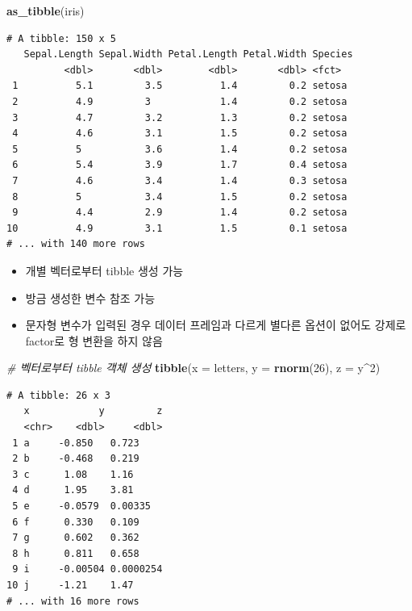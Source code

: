 \documentclass[
  11pt,
]{krantz}
\newenvironment{Shaded}{\begin{snugshade}}{\end{snugshade}}
\newcommand{\CommentTok}[1]{\textcolor[rgb]{0.37,0.37,0.37}{\textit{#1}}}
\newcommand{\DataTypeTok}[1]{\textcolor[rgb]{0.27,0.27,0.27}{#1}}
\newcommand{\DecValTok}[1]{\textcolor[rgb]{0.06,0.06,0.06}{#1}}
\newcommand{\KeywordTok}[1]{\textcolor[rgb]{0.27,0.27,0.27}{\textbf{#1}}}
\newcommand{\NormalTok}[1]{#1}
\newcommand{\OperatorTok}[1]{\textcolor[rgb]{0.43,0.43,0.43}{\textbf{#1}}}
\providecommand{\tightlist}{%
  \setlength{\itemsep}{0pt}\setlength{\parskip}{0pt}}
\begin{document}
\begin{Shaded}
\begin{Highlighting}[]
\KeywordTok{as_tibble}\NormalTok{(iris)}
\end{Highlighting}
\end{Shaded}

\begin{verbatim}
# A tibble: 150 x 5
   Sepal.Length Sepal.Width Petal.Length Petal.Width Species
          <dbl>       <dbl>        <dbl>       <dbl> <fct>  
 1          5.1         3.5          1.4         0.2 setosa 
 2          4.9         3            1.4         0.2 setosa 
 3          4.7         3.2          1.3         0.2 setosa 
 4          4.6         3.1          1.5         0.2 setosa 
 5          5           3.6          1.4         0.2 setosa 
 6          5.4         3.9          1.7         0.4 setosa 
 7          4.6         3.4          1.4         0.3 setosa 
 8          5           3.4          1.5         0.2 setosa 
 9          4.4         2.9          1.4         0.2 setosa 
10          4.9         3.1          1.5         0.1 setosa 
# ... with 140 more rows
\end{verbatim}

\normalsize

\begin{itemize}
\tightlist
\item
  개별 벡터로부터 tibble 생성 가능
\item
  방금 생성한 변수 참조 가능
\item
  문자형 변수가 입력된 경우 데이터 프레임과 다르게 별다른 옵션이 없어도 강제로 factor로 형 변환을 하지 않음
\end{itemize}

\footnotesize

\begin{Shaded}
\begin{Highlighting}[]
\CommentTok{# 벡터로부터 tibble 객체 생성}
\KeywordTok{tibble}\NormalTok{(}\DataTypeTok{x =}\NormalTok{ letters, }\DataTypeTok{y =} \KeywordTok{rnorm}\NormalTok{(}\DecValTok{26}\NormalTok{), }\DataTypeTok{z =}\NormalTok{ y}\OperatorTok{^}\DecValTok{2}\NormalTok{)}
\end{Highlighting}
\end{Shaded}

\begin{verbatim}
# A tibble: 26 x 3
   x            y         z
   <chr>    <dbl>     <dbl>
 1 a     -0.850   0.723    
 2 b     -0.468   0.219    
 3 c      1.08    1.16     
 4 d      1.95    3.81     
 5 e     -0.0579  0.00335  
 6 f      0.330   0.109    
 7 g      0.602   0.362    
 8 h      0.811   0.658    
 9 i     -0.00504 0.0000254
10 j     -1.21    1.47     
# ... with 16 more rows
\end{verbatim}
\end{document}
